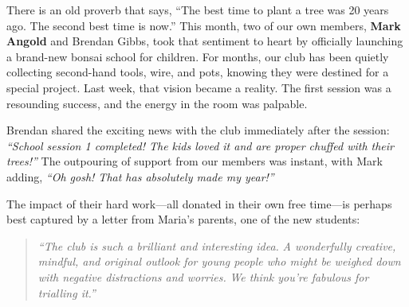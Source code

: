 	

\closearticle
\columnbreak


\label{2026-01-gossip}
\noindent
There is an old proverb that says, ``The best time to plant a tree was 20 years ago.
The second best time is now.''
This month, two of our own members, \textbf{Mark Angold} and {Brendan Gibbs}, took that sentiment to heart by officially launching a brand\--new bonsai school for children.
%
For months, our club has been quietly collecting second\--hand tools, wire, and pots, knowing they were destined for a special project.
Last week, that vision became a reality.
The first session was a resounding success, and the energy in the room was palpable.

\noindent
Brendan shared the exciting news with the club immediately after the session: \textit{``School session 1 completed! The kids loved it and are proper chuffed with their trees!''}
The outpouring of support from our members was instant, with Mark adding, \textit{``Oh gosh! That has absolutely made my year!''}

The impact of their hard work---all donated in their own free time---is perhaps best captured by a letter from Maria's parents, one of the new students:

\begin{quote}
    \textit{``The club is such a brilliant and interesting idea.}
    \textit{A wonderfully creative, mindful, and original outlook for young people who might be weighed down with negative distractions and worries.}
    \textit{We think you're fabulous for trialling it.''}
\end{quote}


